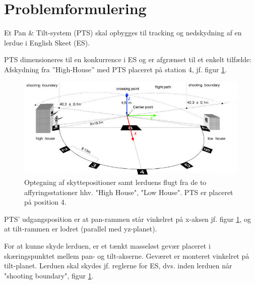 \section{Problemformulering}
\label{sec:problemformulering}

Et Pan \& Tilt-system (PTS) skal opbygges til tracking og nedskydning af en lerdue i English Skeet (ES).

PTS dimensioneres til en konkurrence i ES og er afgrænset til et enkelt tilfælde:
Afskydning fra ”High-House” med PTS placeret på station 4, jf. figur \ref{fig:ES}.
\begin{figure}[th!]
\centering
\includegraphics[width=1\textwidth]{./graphics/skeet_diagram_cropped_axes}
\caption[Skitse af ES]{Optegning af skyttepositioner samt lerduens flugt fra de to affyringsstationer hhv. "High House", "Low House". PTS er placeret på position 4.}
\label{fig:ES}
\end{figure}	
PTS' udgangsposition er at pan-rammen står vinkelret på x-aksen jf. figur \ref{fig:ES},
og at tilt-rammen er lodret (parallel med yz-planet).



For at kunne skyde lerduen, er et tænkt masseløst gevær placeret i skæringspunktet mellem pan- og tilt-akserne. Geværet er monteret vinkelret på tilt-planet. 
 Lerduen skal skydes jf. reglerne for ES, dvs. inden lerduen når "shooting boundary", figur \ref{fig:ES}.

